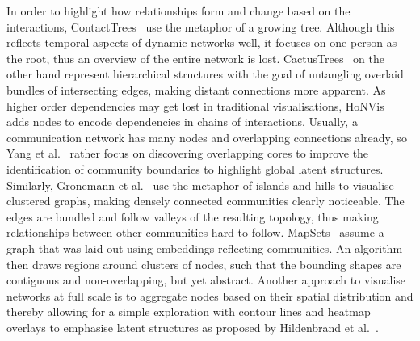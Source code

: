 In order to highlight how relationships form and change based on the interactions, ContactTrees~\cite{sallaberry2016contact} use the metaphor of a growing tree.
Although this reflects temporal aspects of dynamic networks well, it focuses on one person as the root, thus an overview of the entire network is lost.
CactusTrees~\cite{dang2017cactustree} on the other hand represent hierarchical structures with the goal of untangling overlaid bundles of intersecting edges, making distant connections more apparent.
As higher order dependencies may get lost in traditional visualisations, HoNVis~\cite{tao2017honvis} adds nodes to encode dependencies in chains of interactions.
Usually, a communication network has many nodes and overlapping connections already, so Yang et al.~\cite{yang2014overlapping} rather focus on discovering overlapping cores to improve the identification of community boundaries to highlight global latent structures.
Similarly, Gronemann et al.~\cite{gronemann2012drawing} use the metaphor of islands and hills to visualise clustered graphs, making densely connected communities clearly noticeable.
The edges are bundled and follow valleys of the resulting topology, thus making relationships between other communities hard to follow.
MapSets~\cite{efrat2015mapsets} assume a graph that was laid out using embeddings reflecting communities.
An algorithm then draws regions around clusters of nodes, such that the bounding shapes are contiguous and non-overlapping, but yet abstract.
Another approach to visualise networks at full scale is to aggregate nodes based on their spatial distribution and thereby allowing for a simple exploration with contour lines and heatmap overlays to emphasise latent structures as proposed by Hildenbrand et al.~\cite{hildenbrand2016flexible}.

%
%

